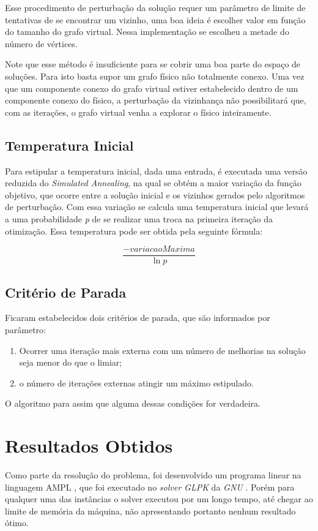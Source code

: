\documentclass{article}
\begin{document}
Esse procedimento de perturbação da solução requer um parâmetro de limite de tentativas de se encontrar um vizinho, uma boa ideia é escolher valor em função do tamanho do grafo virtual. Nessa implementação se escolheu a metade do número de vértices.

Note que esse método é insuficiente para se cobrir uma boa parte do espaço de soluções. Para isto basta supor um grafo físico não totalmente conexo. Uma vez que um componente conexo do grafo virtual estiver estabelecido dentro de um componente conexo do físico, a perturbação da vizinhança não possibilitará que, com as iterações, o grafo virtual venha a explorar o físico inteiramente.

\subsection{Temperatura Inicial}
Para estipular a temperatura inicial, dada uma entrada, é executada uma versão reduzida do \emph{Simulated Annealing}, na qual se obtém a maior variação da função objetivo, que ocorre entre a solução inicial e os vizinhos gerados pelo algoritmos de perturbação. Com essa variação se calcula uma temperatura inicial que levará a uma probabilidade \emph{p} de se realizar uma troca na primeira iteração da otimização. Essa temperatura pode ser obtida pela seguinte fórmula:

\begin{displaymath}
\frac{-variacaoMaxima}{\ln p}
\end{displaymath}

\subsection{Critério de Parada}
Ficaram estabelecidos dois critérios de parada, que são informados por parâmetro:
\begin{enumerate}
\item Ocorrer uma iteração mais externa com um número de melhorias na solução seja menor do que o limiar;
\item o número de iterações externas atingir um máximo estipulado.
\end{enumerate}
O algoritmo para assim que alguma dessas condições for verdadeira.

\section{Resultados Obtidos}
Como parte da resolução do problema, foi desenvolvido um programa linear na linguagem AMPL \cite{AMPL}, que foi executado no \emph{solver GLPK} da \emph{GNU} \cite{GLPK}. Porém para qualquer uma das instâncias o solver executou por um longo tempo, até chegar ao limite de memória da máquina, não apresentando portanto nenhum resultado ótimo.
\end{document}
